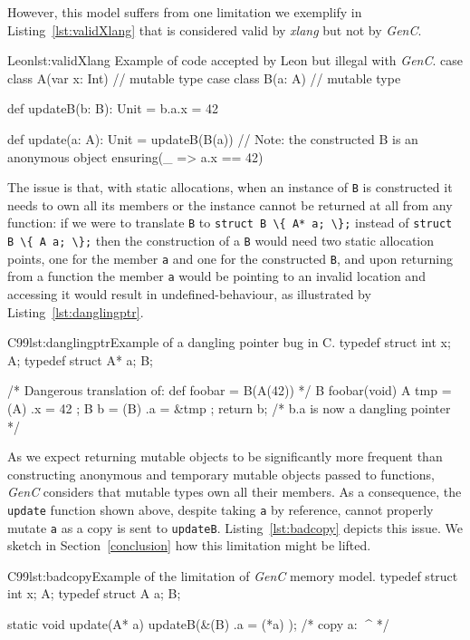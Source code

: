 \documentclass[a4paper,twoside]{article}
\newcommand{\InlineC}[1]{\lstinline[language=C99]|#1|}
\newcommand{\InlineS}[1]{\lstinline[language=Leon]|#1|}
\newcommand{\GenC}{\emph{GenC}\xspace}
\newcommand{\RefSec}[1]{Section~\ref{#1}}
\newcommand{\RefCode}[1]{Listing~\ref{#1}}
\begin{document}
However, this model suffers from one limitation we exemplify in
\RefCode{lst:validXlang} that is considered valid by \emph{xlang} but not by
\GenC.

\begin{Code}{Leon}{lst:validXlang}{%
Example of code accepted by Leon but illegal with \GenC.}
case class A(var x: Int) // mutable type
case class B(a: A)       // mutable type

def updateB(b: B): Unit = {
  b.a.x = 42
}

def update(a: A): Unit = {
  updateB(B(a)) // Note: the constructed B is an anonymous object
} ensuring(_ => a.x == 42)
\end{Code}

The issue is that, with static allocations, when an instance of \InlineS{B} is
constructed it needs to own all its members or the instance cannot be returned
at all from any function: if we were to translate \InlineS{B} to \InlineC{struct
B \{ A* a; \};} instead of \InlineC{struct B \{ A a; \};} then the construction
of a \InlineS{B} would need two static allocation points, one for the member
\InlineS{a} and one for the constructed \InlineS{B}, and upon returning from a
function the member \InlineS{a} would be pointing to an invalid location and
accessing it would result in undefined-behaviour, as illustrated by
\RefCode{lst:danglingptr}.

\begin{Code}{C99}{lst:danglingptr}{Example of a dangling pointer bug in C.}
typedef struct { int x; } A;
typedef struct { A* a; } B;

/* Dangerous translation of: def foobar = B(A(42)) */
B foobar(void) {
  A tmp = (A) { .x = 42 };
  B b = (B) { .a = &tmp };
  return b;
} /* b.a is now a dangling pointer */
\end{Code}

As we expect returning mutable objects to be significantly more frequent than
constructing anonymous and temporary mutable objects passed to functions, \GenC
considers that mutable types own all their members. As a consequence, the
\InlineS{update} function shown above, despite taking \InlineS{a} by reference,
cannot properly mutate \InlineS{a} as a copy is sent to \InlineS{updateB}.
\RefCode{lst:badcopy} depicts this issue. We sketch in \RefSec{conclusion} how
this limitation might be lifted.

\begin{Code}{C99}{lst:badcopy}{Example of the limitation of \GenC memory model.}
typedef struct { int x; } A;
typedef struct { A a; } B;

static void update(A* a) {
  updateB(&(B) { .a = (*a) });
  /* copy a:          ^^^^  */
}
\end{Code}
\end{document}
